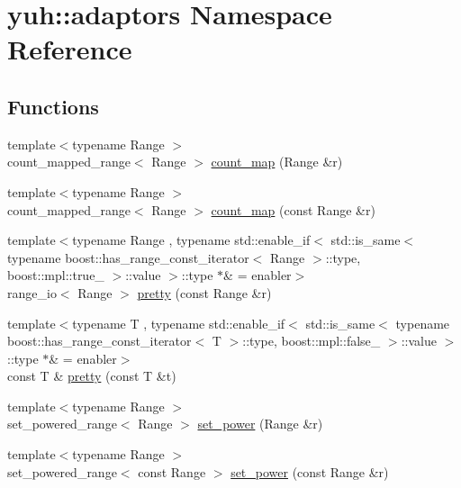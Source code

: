 \hypertarget{namespaceyuh_1_1adaptors}{\section{yuh\-:\-:adaptors \-Namespace \-Reference}
\label{de/d55/namespaceyuh_1_1adaptors}
}
\subsection*{\-Functions}
\begin{DoxyCompactItemize}
\item 
{\footnotesize template$<$typename Range $>$ }\\count\-\_\-mapped\-\_\-range$<$ \-Range $>$ \hyperlink{namespaceyuh_1_1adaptors_acb67fe5826a7f7b7ac61edf1dfcff82f}{count\-\_\-map} (\-Range \&r)
\item 
{\footnotesize template$<$typename Range $>$ }\\count\-\_\-mapped\-\_\-range$<$ \-Range $>$ \hyperlink{namespaceyuh_1_1adaptors_a7832edf38320aa72804efae4522aeacb}{count\-\_\-map} (const \-Range \&r)
\item 
{\footnotesize template$<$typename Range , typename std\-::enable\-\_\-if$<$ std\-::is\-\_\-same$<$ typename boost\-::has\-\_\-range\-\_\-const\-\_\-iterator$<$ Range $>$\-::type, boost\-::mpl\-::true\-\_\- $>$\-::value $>$\-::type $\ast$\&  = enabler$>$ }\\range\-\_\-io$<$ \-Range $>$ \hyperlink{namespaceyuh_1_1adaptors_ad5660c286c614db267091a07245d32b6}{pretty} (const \-Range \&r)
\item 
{\footnotesize template$<$typename T , typename std\-::enable\-\_\-if$<$ std\-::is\-\_\-same$<$ typename boost\-::has\-\_\-range\-\_\-const\-\_\-iterator$<$ T $>$\-::type, boost\-::mpl\-::false\-\_\- $>$\-::value $>$\-::type $\ast$\&  = enabler$>$ }\\const \-T \& \hyperlink{namespaceyuh_1_1adaptors_a7797a297cbbdae1a1876471228638d75}{pretty} (const \-T \&t)
\item 
{\footnotesize template$<$typename Range $>$ }\\set\-\_\-powered\-\_\-range$<$ \-Range $>$ \hyperlink{namespaceyuh_1_1adaptors_af3fcfee5424bbff193826b77df52f6e5}{set\-\_\-power} (\-Range \&r)
\item 
{\footnotesize template$<$typename Range $>$ }\\set\-\_\-powered\-\_\-range$<$ const \-Range $>$ \hyperlink{namespaceyuh_1_1adaptors_a1234598f449f8f846dd3f26fe83f6682}{set\-\_\-power} (const \-Range \&r)
\end{DoxyCompactItemize}


